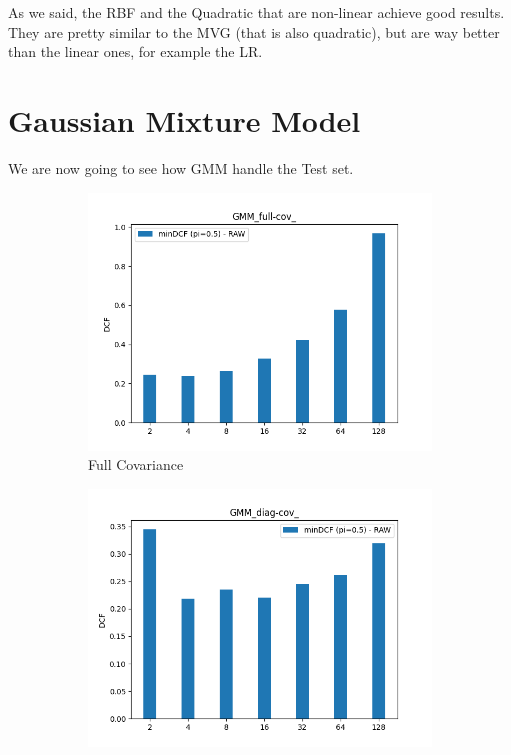 \documentclass[english]{report}
\begin{document}
As we said, the RBF and the Quadratic that are non-linear achieve good results. They are pretty similar to 
the MVG (that is also quadratic), but are way better than the linear ones, for example the LR. 




\newpage

\section{Gaussian Mixture Model}
We are now going to see how GMM handle the Test set. 

\begin{figure}[h!]
    \begin{subfigure}{0.3\textwidth}
        \includegraphics[scale=0.3]{../../images/evaluation/GMM_full-cov_component_comparison.png}
        \caption{Full Covariance}
    \end{subfigure}
    \begin{subfigure}{0.3\textwidth}
        \includegraphics[scale=0.3]{../../images/evaluation/GMM_diag-cov_component_comparison.png}

\end{subfigure}
\end{figure}
\end{document}
